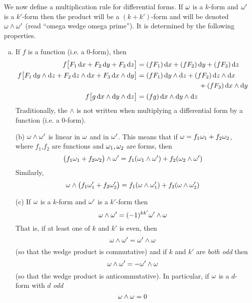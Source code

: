 \begin{defn}
             \label{def:differentialFormMult}
We now define a multiplication rule for differential forms. 
If $\omega$ is a $k$-form and $\omega'$ is a 
$k'$-form then the product will be a $(k+k')$-form and will be denoted
$\omega\wedge\omega'$ (read ``omega wedge omega prime''). It is 
determined by the following properties.
\begin{enumerate}[(a)]
\item
If $f$ is a function (i.e. a $0$-form), then
\begin{align*}
 f\big[F_1\,\mathrm{d}x + F_2\,\mathrm{d}y + F_3\,\mathrm{d}z\big]
   &= (fF_1)\,\mathrm{d}x + (fF_2)\,\mathrm{d}y + (fF_3)\,\mathrm{d}z
\\
 f\big[F_1\,\mathrm{d}y\wedge\mathrm{d}z
       + F_2\,\mathrm{d}z\wedge\mathrm{d}x 
       + F_3\,\mathrm{d}x\wedge\mathrm{d}y\big]
  &=(fF_1)\,\mathrm{d}y\wedge\mathrm{d}z
       + (fF_2)\,\mathrm{d}z\wedge\mathrm{d}x \\&\hskip1.25in
       + (fF_3)\,\mathrm{d}x\wedge\mathrm{d}y
\\
 f\big[g\,\mathrm{d}x\wedge\mathrm{d}y\wedge\mathrm{d}z\big]
   &= (fg)\,\mathrm{d}x\wedge\mathrm{d}y\wedge\mathrm{d}z
\end{align*}
Traditionally, the $\wedge$ is not written when multiplying
a differential form by a function (i.e. a $0$-form).

\item[(b)] %
$\omega\wedge\omega'$ is linear in $\omega$ and in $\omega'$. This means that
if $\omega = f_1\omega_1+f_2\omega_2$, where $f_1$,$f_2$ are 
functions and $\omega_1,\omega_2$ are forms, then
\begin{equation*}
\big(f_1\omega_1+f_2\omega_2\big)\wedge \omega'= f_1 (\omega_1\wedge\omega')
+f_2 (\omega_2\wedge\omega')
\end{equation*}
Similarly, 
\begin{equation*}
\omega\wedge\big(f_1\omega'_1+f_2\omega'_2\big)= f_1 (\omega\wedge\omega'_1)
+f_2 (\omega\wedge\omega'_2)
\end{equation*}


\item[(c)] %
If $\omega$ is a $k$-form and $\omega'$ is a  $k'$-form then \begin{equation*}
   \omega\wedge\omega'=(-1)^{kk'}\omega'\wedge\omega
\end{equation*}
That is, if at least one of $k$ and $k'$ is even, then
\begin{equation*}
\omega\wedge\omega'=\omega'\wedge\omega
\end{equation*}
(so that the wedge product is commutative) 
and if $k$ and $k'$ are \emph{both odd} then 
\begin{equation*}
\omega\wedge\omega'=-\omega'\wedge\omega
\end{equation*} 
(so that the wedge product is anticommutative).
In particular, if $\omega$ is a $d$-form with $d$ \emph{odd}
\begin{equation*}
\omega\wedge\omega = 0
\end{equation*}


\end{enumerate}
\end{defn}
